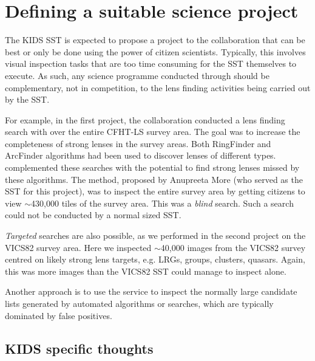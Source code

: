 \documentclass[a4paper,twocolumn]{article}
\begin{document}


\section{Defining a suitable \sw science project}
\label{sec:project}

The KIDS SST is expected to propose a project to the \SW collaboration
that can be best or only be done using the power of citizen
scientists. Typically, this involves visual inspection tasks that are
too time consuming for the SST themselves to execute. As such, any
science programme conducted through \SW should be complementary, not
in competition, to the lens finding activities being carried out by
the SST.

For example, in the first \SW project, the collaboration conducted a
lens finding search with \SW over the entire CFHT-LS survey area. The
goal was to increase the completeness of strong lenses in the survey
areas. Both RingFinder and ArcFinder algorithms had been used to
discover lenses of different types. \SW complemented these searches
with the potential to find strong lenses missed by these
algorithms. The method, proposed by Anupreeta More (who served as the
SST for this project), was to inspect the entire survey area by
getting citizens to view $\sim$430,000 tiles of the survey area. This
was a \textit{blind} search. Such a search could not be conducted by a
normal sized SST.

\textit{Targeted} searches are also possible, as we performed in the
second \SW project on the VICS82 survey area. Here we inspected
$\sim$40,000 images from the VICS82 survey centred on likely strong
lens targets, e.g. LRGs, groups, clusters, quasars.  Again, this was
more images than the VICS82 SST could manage to inspect alone.

Another approach is to use the \SW service to inspect the normally
large candidate lists generated by automated algorithms or searches,
which are typically dominated by false positives.

\subsection{KIDS specific thoughts}
\end{document}
